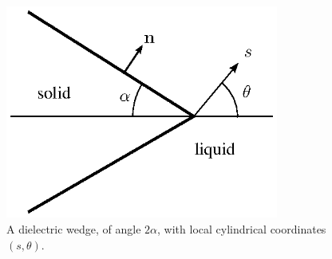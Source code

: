 \begin{figure}[ht]
\begin{center}
\includegraphics[width=0.8\textwidth,clip=true]{eddies/eddy_fig3b.eps}

\end{center}

\caption{A dielectric wedge, of angle $2\alpha$, with local
cylindrical coordinates $(s,\theta)$.
\label{fig:corner}}
\end{figure}

